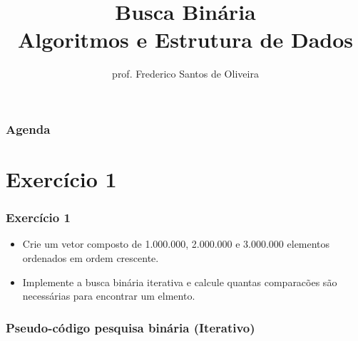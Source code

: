 \documentclass[aspectratio=169]{beamer}
\title[Aula Prática Algoritmos de Ordenação]{Busca Binária\\
   Algoritmos e Estrutura de Dados}
\author[Frederico Santos de Oliveira]{prof. Frederico Santos de Oliveira}
\institute[UFMT]{Universidade Federal de Mato Grosso\\ Instituto de Engenharia}
\date{}
\begin{document}
\begin{frame}[plain]
  \titlepage
\end{frame}


\begin{frame}
  \frametitle{Agenda}
  \tableofcontents
\end{frame}


\section{Exercício 1}

\begin{frame}
\frametitle{Exercício 1}

\begin{itemize}
 \item Crie um vetor composto de 1.000.000, 2.000.000 e 3.000.000 elementos ordenados em ordem crescente. 
 \item Implemente a busca binária iterativa e calcule quantas comparacões são necessárias para encontrar um elmento.
\end{itemize} 
\end{frame}



\begin{frame}
\frametitle{Pseudo-código pesquisa binária (Iterativo)}
\end{frame}
\end{document}
